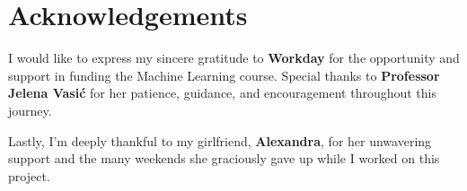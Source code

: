 \clearpage
\pagestyle{empty} 

\section*{Acknowledgements}

I would like to express my sincere gratitude to \textbf{Workday} for the opportunity and support in funding the 
Machine Learning course. Special thanks to \textbf{Professor Jelena Vasić} for her patience, guidance, and 
encouragement throughout this journey. 

Lastly, I’m deeply thankful to my girlfriend, \textbf{Alexandra}, for her unwavering support and the many weekends 
she graciously gave up while I worked on this project.
